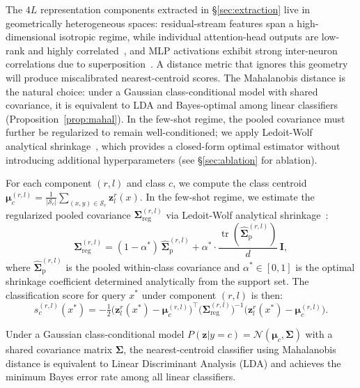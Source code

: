 \documentclass[sigconf,review,anonymous,9pt,table]{acmart}
\begin{document}
The $4L$ representation components extracted in §\ref{sec:extraction} live in geometrically heterogeneous spaces: residual-stream features span a high-dimensional isotropic regime, while individual attention-head outputs are low-rank and highly correlated~\cite{elhage2021mathematical}, and MLP activations exhibit strong inter-neuron correlations due to superposition~\cite{elhage2022toy}.
A distance metric that ignores this geometry will produce miscalibrated nearest-centroid scores.
The Mahalanobis distance is the natural choice: under a Gaussian class-conditional model with shared covariance, it is equivalent to LDA and Bayes-optimal among linear classifiers (Proposition~\ref{prop:mahal}).
In the few-shot regime, the pooled covariance must further be regularized to remain well-conditioned; we apply Ledoit-Wolf analytical shrinkage~\cite{ledoit2004well}, which provides a closed-form optimal estimator without introducing additional hyperparameters (see §\ref{sec:ablation} for ablation).

For each component $(r, l)$ and class $c$, we compute the class centroid $\boldsymbol{\mu}_c^{(r,l)} = \frac{1}{|\mathcal{S}_c|} \sum_{(x, y) \in \mathcal{S}_c} \mathbf{z}_l^r(x)$. 
In the few-shot regime, we estimate the regularized pooled covariance $\boldsymbol{\Sigma}_{\text{reg}}^{(r,l)}$ via Ledoit-Wolf analytical shrinkage~\cite{ledoit2004well}:
\begin{equation}
  \boldsymbol{\Sigma}_{\text{reg}}^{(r,l)} = (1 - \alpha^*) \,\hat{\boldsymbol{\Sigma}}_{\text{p}}^{(r,l)} + \alpha^* \cdot \frac{\operatorname{tr}(\hat{\boldsymbol{\Sigma}}_{\text{p}}^{(r,l)})}{d} \,\mathbf{I},
  \label{eq:sigma_reg}
\end{equation}
where $\hat{\boldsymbol{\Sigma}}_{\text{p}}^{(r,l)}$ is the pooled within-class covariance and $\alpha^* \in [0, 1]$ is the optimal shrinkage coefficient determined analytically from the support set. 
The classification score for query $x^*$ under component $(r, l)$ is then:
\begin{equation}
  s_c^{(r,l)}(x^*) = -\tfrac{1}{2} \bigl(\mathbf{z}_l^r(x^*) - \boldsymbol{\mu}_c^{(r,l)}\bigr)^\top \!\bigl(\boldsymbol{\Sigma}_{\text{reg}}^{(r,l)}\bigr)^{-1} \bigl(\mathbf{z}_l^r(x^*) - \boldsymbol{\mu}_c^{(r,l)}\bigr).
  \label{eq:mahal}
\end{equation}

\begin{proposition}
\label{prop:mahal}
Under a Gaussian class-conditional model $P(\mathbf{z}|y=c) = \mathcal{N}(\boldsymbol{\mu}_c, \boldsymbol{\Sigma})$ with a shared covariance matrix $\boldsymbol{\Sigma}$, the nearest-centroid classifier using Mahalanobis distance is equivalent to Linear Discriminant Analysis (LDA) and achieves the minimum Bayes error rate among all linear classifiers.
\end{proposition}
\end{document}
